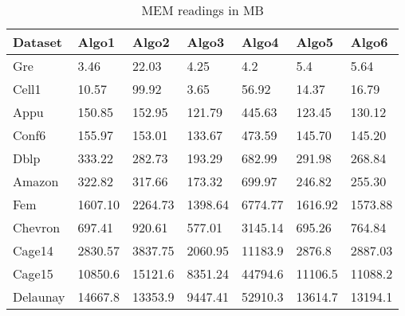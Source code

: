 

\begin{table}[th]
\begin{center}
    \begin{tabular}{| l | l | l | l | l | l | l |}
    \hline
	Dataset & Algo1 & Algo2 & Algo3 & Algo4 & Algo5 & Algo6\\ \hline
	Gre & 3.46 & 22.03 & 4.25 & 4.2 & 5.4 & 5.64 \\ \hline
	Cell1 & 10.57 & 99.92 & 3.65 & 56.92 & 14.37 & 16.79\\ \hline
	Appu & 150.85 & 152.95 & 121.79 & 445.63 & 123.45 & 130.12\\ \hline
	Conf6 & 155.97 & 153.01 & 133.67 & 473.59 & 145.70 & 145.20\\ \hline
	Dblp & 333.22 & 282.73 & 193.29 & 682.99 & 291.98 & 268.84\\ \hline
	Amazon & 322.82 & 317.66 & 173.32 & 699.97 & 246.82 & 255.30\\ \hline
	Fem & 1607.10 & 2264.73 & 1398.64 & 6774.77 & 1616.92 & 1573.88\\ \hline
	Chevron & 697.41 & 920.61 & 577.01 & 3145.14 & 695.26 & 764.84\\ \hline
	Cage14 & 2830.57 & 3837.75 & 2060.95 & 11183.9 & 2876.8 & 2887.03\\ \hline
	Cage15 & 10850.6 & 15121.6 & 8351.24 & 44794.6 & 11106.5 & 11088.2\\ \hline
	Delaunay & 14667.8 & 13353.9 & 9447.41 & 52910.3 & 13614.7 & 13194.1\\ \hline
    \hline
    \end{tabular}
\end{center}
\caption{\capfont MEM readings in MB}
\label{tab:Table3}
\end{table}


